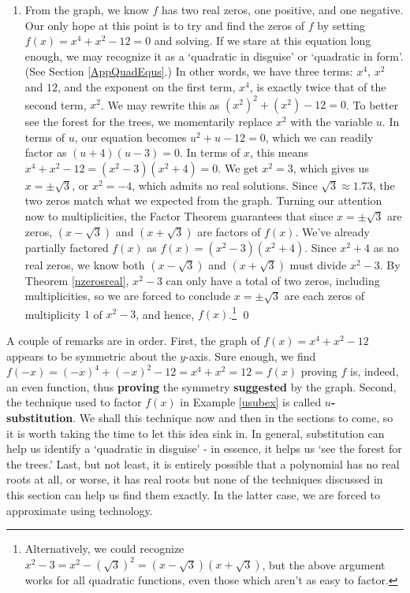 \documentclass{ximera}
\begin{document}
\begin{example}
\begin{enumerate}
\item  From the graph, we know $f$ has two real zeros, one positive, and one negative.  Our only hope at this point is to try and find the zeros of $f$ by setting $f(x)=x^4+x^2-12=0$ and solving.  If we stare at this equation long enough, we may recognize it as a `quadratic in disguise' or `quadratic in form'. (See Section \ref{AppQuadEqus}.)   In other words, we have three terms: $x^4$, $x^2$ and $12$, and the exponent on the first term, $x^4$, is exactly twice that of the second term, $x^2$.  We may rewrite this as $\left(x^2\right)^2 + \left(x^2\right) - 12 = 0$.  To better see the forest for the trees, we momentarily replace $x^2$ with the variable $u$.  In terms of $u$, our equation becomes $u^2 + u - 12 = 0$, which we can readily factor as $(u+4)(u-3) = 0$.  In terms of $x$, this means $x^4+x^2-12= \left(x^2-3\right) \left(x^2 + 4 \right)=0$. We get $x^2 = 3$, which gives us $x = \pm \sqrt{3}$, or $x^2=-4$, which admits no real solutions.  Since $\sqrt{3} \approx 1.73$, the two zeros match what we expected from the graph.  Turning our attention now to multiplicities, the Factor Theorem guarantees that since $x = \pm \sqrt{3}$ are zeros, $(x- \sqrt{3})$ and $(x + \sqrt{3})$ are factors of $f(x)$.  We've already partially factored  $f(x)$ as $f(x)  = \left(x^2-3\right) \left(x^2 + 4 \right)$.  Since $x^2+4$ as no real zeros, we know both $(x-\sqrt{3})$ and $(x+\sqrt{3})$ must divide $x^2-3$.  By Theorem \ref{nzerosreal},  $x^2-3$ can only have a total of two zeros, including multiplicities, so we are forced to conclude $x = \pm \sqrt{3}$ are each zeros of multiplicity $1$ of $x^2-3$, and hence, $f(x)$.\footnote{Alternatively, we could recognize $x^2 -3 = x^2-(\sqrt{3})^2 = (x-\sqrt{3})(x+\sqrt{3})$, but the above argument works for all quadratic functions, even those which aren't as easy to factor.} \qed

\end{enumerate}

\label{usubex}

\end{example}

A couple of remarks are in order.  First, the graph of $f(x) = x^4 + x^2 - 12$ appears to be symmetric about the $y$-axis.  Sure enough, we find $f(-x) = (-x)^4+(-x)^2  - 12 = x^4+x^2=12 = f(x)$ proving $f$ is, indeed, an even function, thus \textbf{proving} the symmetry \textbf{suggested} by the graph.  Second, the technique used to factor $f(x)$ in Example \ref{usubex} is called  \textbf{{\boldmath $u$}-substitution}.  We shall this technique now and then in the sections to come, so it is worth taking the time to let this idea sink in.  In general, substitution can help us identify a `quadratic in disguise' - in essence, it helps us `see the forest for the trees.'  Last, but not least, it is entirely possible that a polynomial has no real roots at all, or worse, it has real roots but none of the techniques discussed in this section can help us find them exactly.  In the latter case, we are forced to approximate using technology.  
\end{document}
